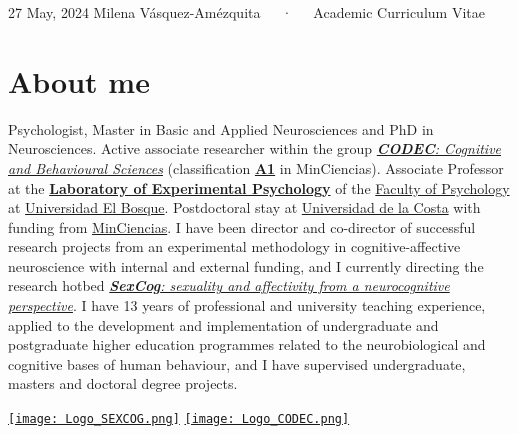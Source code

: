 \documentclass[11pt,a4paper,]{awesome-cv}
\begin{document}
\makecvheader

\makecvfooter
  {27 May, 2024}
    {Milena Vásquez-Amézquita~~~·~~~Academic Curriculum Vitae}
  {\thepage}





\section{About me}\label{about-me}

\begin{minipage}[c]{0.85\linewidth}
Psychologist, Master in Basic and Applied Neurosciences and PhD in Neurosciences. Active associate researcher within the group \href{https://investigaciones.unbosque.edu.co/codec}{\textit{\textbf{CODEC}: Cognitive and Behavioural Sciences}} (classification \href{https://scienti.minciencias.gov.co/gruplac/jsp/visualiza/visualizagr.jsp?nro=00000000001446}{\textbf{A1}} in MinCiencias). Associate Professor at the \href{https://grupo-codec.netlify.app/labpsiexp/}{\textbf{Laboratory of Experimental Psychology}} of the \href{https://www.uelbosque.edu.co/psicologia}{Faculty of Psychology} at \href{https://www.uelbosque.edu.co/}{Universidad El Bosque}. Postdoctoral stay at \href{https://www.cuc.edu.co/}{Universidad de la Costa} with funding from \href{https://minciencias.gov.co/}{MinCiencias}. I have been director and co-director of successful research projects from an experimental methodology in cognitive-affective neuroscience with internal and external funding, and I currently directing the research hotbed \href{https://grupo-codec.netlify.app/sexcog/}{\textit{\textbf{SexCog}: sexuality and affectivity from a neurocognitive perspective}}. I have 13 years of professional and university teaching experience, applied to the development and implementation of undergraduate and postgraduate higher education programmes related to the neurobiological and cognitive bases of human behaviour, and I have supervised undergraduate, masters and doctoral degree projects.
\end{minipage} \begin{minipage}[c]{0.15\linewidth}
\begin{flushright} 
\hfill \href{https://grupo-codec.netlify.app/sexcog/}{\texttt{[image: Logo\_SEXCOG.png]}} \newline \href{https://investigaciones.unbosque.edu.co/codec}{\texttt{[image: Logo\_CODEC.png]}}
\end{flushright}
\end{minipage}
\end{document}
